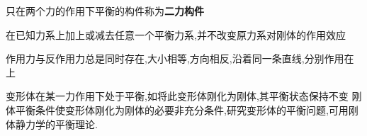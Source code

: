 \begin{definition}[二力构件]
    只在两个力的作用下平衡的构件称为\textbf{二力构件}
\end{definition}

\begin{theorem}[加减平衡力系原理]
    在已知力系上加上或减去任意一个平衡力系,并不改变原力系对刚体的作用效应
    
\end{theorem}

\begin{inference}[刚体力的可传性]

\end{inference}

\begin{theorem}[作用力和反作用力定律]
    作用力与反作用力总是同时存在,大小相等,方向相反,沿着同一条直线,分别作用在上
\end{theorem}


\begin{theorem}[刚化原理]
    变形体在某一力作用下处于平衡,如将此变形体刚化为刚体,其平衡状态保持不变
    刚体平衡条件使变形体刚化为刚体的必要非充分条件,研究变形体的平衡问题,可用刚体静力学的平衡理论.
\end{theorem}